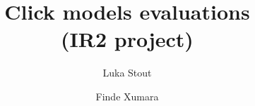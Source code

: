 \documentclass{llncs} %
\title{
Click models evaluations\\
\small {(IR2 project)}
}
\author{
Luka Stout\inst{1}
\and
Finde Xumara\inst{1}
}
\institute{University of Amsterdam}
\begin{document}
\nocite{*}
\maketitle







{}


\newpage

\end{document}
